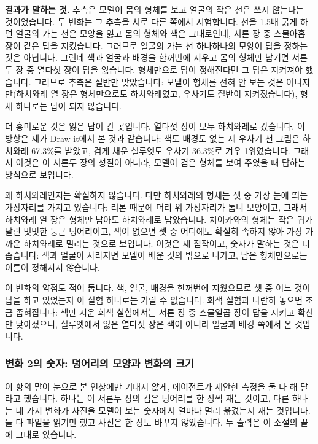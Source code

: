 \documentclass[11pt]{article}
\begin{document}
\textbf{결과가 말하는 것.} 추측은 모델이 몸의 형체를 보고 얼굴의 작은 선은 쓰지
않는다는 것이었습니다. 두 변화는 그 추측을 서로 다른 쪽에서 시험합니다. 선을
1.5배 굵게 하면 얼굴의 가는 선은 모양을 잃고 몸의 형체와 색은 그대로인데, 서른
장 중 스물아홉 장이 같은 답을 지켰습니다. 그러므로 얼굴의 가는 선 하나하나의
모양이 답을 정하는 것은 아닙니다. 그런데 색과 얼굴과 배경을 한꺼번에 지우고
몸의 형체만 남기면 서른두 장 중 열다섯 장이 답을 잃습니다. 형체만으로 답이
정해진다면 그 답은 지켜져야 했습니다. 그러므로 추측은 절반만 맞았습니다: 모델이
형체를 전혀 안 보는 것은 아니지만(하치와레 열 장은 형체만으로도 하치와레였고,
우사기도 절반이 지켜졌습니다), 형체 하나로는 답이 되지 않습니다.

더 흥미로운 것은 잃은 답이 간 곳입니다. 열다섯 장이 모두 하치와레로 갔습니다.
이 방향은 제가 Draw it에서 본 것과 같습니다: 색도 배경도 없는 제 우사기 선
그림은 하치와레 67.3\%를 받았고, 검게 채운 실루엣도 우사기 36.3\%로 겨우
1위였습니다. 그래서 이것은 이 서른두 장의 성질이 아니라, 모델이 검은 형체를
보여 주었을 때 답하는 방식으로 보입니다.

왜 하치와레인지는 확실하지 않습니다. 다만 하치와레의 형체는 셋 중 가장 눈에
띄는 가장자리를 가지고 있습니다: 리본 때문에 머리 위 가장자리가 톱니 모양이고,
그래서 하치와레 열 장은 형체만 남아도 하치와레로 남았습니다. 치이카와의 형체는
작은 귀가 달린 밋밋한 둥근 덩어리이고, 색이 없으면 셋 중 어디에도 확실히
속하지 않아 가장 가까운 하치와레로 밀리는 것으로 보입니다. 이것은 제 짐작이고,
숫자가 말하는 것은 더 좁습니다: 색과 얼굴이 사라지면 모델이 배운 것의 밖으로
나가고, 남은 형체만으로는 이름이 정해지지 않습니다.

이 변화의 약점도 적어 둡니다. 색, 얼굴, 배경을 한꺼번에 지웠으므로 셋 중 어느
것이 답을 하고 있었는지 이 실험 하나로는 가릴 수 없습니다. 회색 실험과 나란히
놓으면 조금 좁혀집니다: 색만 지운 회색 실험에서는 서른 장 중 스물일곱 장이 답을
지키고 확신만 낮아졌으니, 실루엣에서 잃은 열다섯 장은 색이 아니라 얼굴과 배경
쪽에서 온 것입니다.

\subsubsection*{변화 2의 숫자: 덩어리의 모양과 변화의 크기}

이 항의 말이 눈으로 본 인상에만 기대지 않게, 에이전트가 제안한 측정을 둘 다 해
달라고 했습니다. 하나는 이 서른두 장의 검은 덩어리를 한 장씩 재는 것이고, 다른
하나는 네 가지 변화가 사진을 모델이 보는 숫자에서 얼마나 멀리 옮겼는지 재는
것입니다. 둘 다 파일을 읽기만 했고 사진은 한 장도 바꾸지 않았습니다. 두 출력은
이 소절의 끝에 그대로 있습니다.
\end{document}
